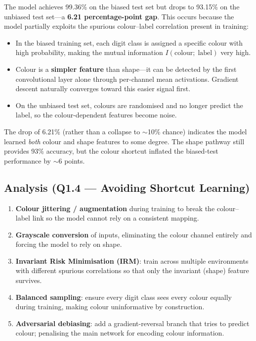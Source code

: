 \documentclass[11pt,a4paper]{article}
\begin{document}
The model achieves 99.36\% on the biased test set but drops to 93.15\% on the
unbiased test set---a \textbf{6.21 percentage-point gap}. This occurs because
the model partially exploits the spurious colour--label correlation present in
training:
\begin{itemize}
  \item In the biased training set, each digit class is assigned a specific
        colour with high probability, making the mutual information
        $I(\text{colour};\;\text{label})$ very high.
  \item Colour is a \textbf{simpler feature} than shape---it can be detected
        by the first convolutional layer alone through per-channel mean
        activations. Gradient descent naturally converges toward this easier
        signal first.
  \item On the unbiased test set, colours are randomised and no longer predict
        the label, so the colour-dependent features become noise.
\end{itemize}

The drop of 6.21\% (rather than a collapse to $\sim$10\% chance) indicates the
model learned \emph{both} colour and shape features to some degree. The shape
pathway still provides 93\% accuracy, but the colour shortcut inflated the
biased-test performance by $\sim$6 points.

\subsection{Analysis (Q1.4 --- Avoiding Shortcut Learning)}

\begin{enumerate}
  \item \textbf{Colour jittering / augmentation} during training to break the
        colour--label link so the model cannot rely on a consistent mapping.
  \item \textbf{Grayscale conversion} of inputs, eliminating the colour channel
        entirely and forcing the model to rely on shape.
  \item \textbf{Invariant Risk Minimisation (IRM)}: train across multiple
        environments with different spurious correlations so that only the
        invariant (shape) feature survives.
  \item \textbf{Balanced sampling}: ensure every digit class sees every colour
        equally during training, making colour uninformative by construction.
  \item \textbf{Adversarial debiasing}: add a gradient-reversal branch that
        tries to predict colour; penalising the main network for encoding
        colour information.
\end{enumerate}
\end{document}
